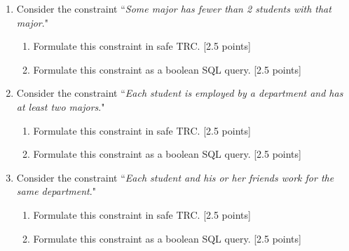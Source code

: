 \documentclass{article}
\begin{document}
\begin{enumerate}[resume]
\item Consider the constraint ``\emph{Some major has fewer than 2 students with that major}."
\begin{enumerate}
\item Formulate this constraint in safe TRC. [2.5 points]
\item Formulate this constraint as a boolean SQL query. [2.5 points]
\end{enumerate}

\item Consider the constraint ``\emph{Each student is employed by a department and has at least two majors}."
\begin{enumerate}
\item Formulate this constraint in safe TRC. [2.5 points]
\item Formulate this constraint as a boolean SQL query. [2.5 points]
\end{enumerate}

\item Consider the constraint ``\emph{Each student and his or her friends work for the same department}."
\begin{enumerate}
\item Formulate this constraint in safe TRC. [2.5 points]
\item Formulate this constraint as a boolean SQL query. [2.5 points]
\end{enumerate}

\end{enumerate}
\end{document}

